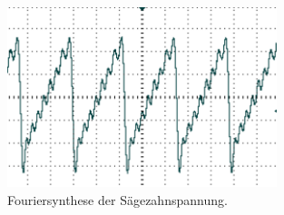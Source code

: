 \begin{figure}
	\centering
		\includegraphics[width=0.7\textwidth]{Bilder/1-9_SZ.pdf}		
\caption{Fouriersynthese der Sägezahnspannung.}
	\label{fig:1-9_SZ}
\end{figure}

